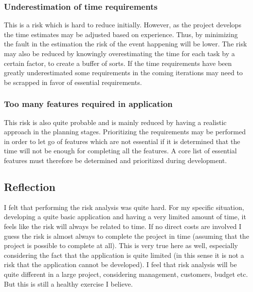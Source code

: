 \documentclass[12pt, letterpaper]{article}
\begin{document}
\subsubsection{Underestimation of time requirements}
This is a risk which is hard to reduce initially. However, as the project develops the time estimates may be adjusted based on experience. Thus, by minimizing the fault in the estimation the risk of the event happening will be lower. The risk may also be reduced by knowingly overestimating the time for each task by a certain factor, to create a buffer of sorts. If the time requirements have been greatly underestimated some requirements in the coming iterations may need to be scrapped in favor of essential requirements.
\subsubsection{Too many features required in application}
This risk is also quite probable and is mainly reduced by having a realistic approach in the planning stages. Prioritizing the requirements may be performed in order to let go of features which are not essential if it is determined that the time will not be enough for completing all the features. A core list of essential features must therefore be determined and prioritized during development. 
\subsection{Reflection}
I felt that performing the risk analysis was quite hard. For my specific situation, developing a quite basic application and having a very limited amount of time, it feels like the risk will always be related to time. If no direct costs are involved I guess the risk is almost always to complete the project in time (assuming that the project is possible to complete at all). This is very true here as well, especially considering the fact that the application is quite limited (in this sense it is not a risk that the application cannot be developed). I feel that risk analysis will be quite different in a large project, considering management, customers, budget etc. But this is still a healthy exercise I believe.
\end{document}
